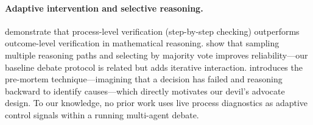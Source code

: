 \paragraph{Adaptive intervention and selective reasoning.}
\citet{lightman2023verify} demonstrate that process-level verification
(step-by-step checking) outperforms outcome-level verification in
mathematical reasoning.
\citet{wang2023selfconsistency} show that sampling multiple reasoning paths
and selecting by majority vote improves reliability—our baseline debate
protocol is related but adds iterative interaction.
\citet{klein2007performing} introduces the pre-mortem technique—imagining
that a decision has failed and reasoning backward to identify causes—which
directly motivates our devil's advocate design.
To our knowledge, no prior work uses live process diagnostics as adaptive
control signals within a running multi-agent debate.
